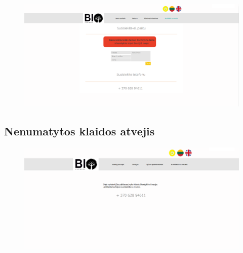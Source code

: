 \documentclass[a4paper,12pt]{article}
\begin{document}
\begin{figure}[!tph]
\hspace{-2cm}
\includegraphics[scale=0.5]{interfeisai/susisiekimasSuKlaida}
\label{fig:verticalcell}
\end{figure}

\subsection{Nenumatytos klaidos atvejis}
\begin{figure}[!tph]
\hspace{-3cm}
\centering
\includegraphics[scale=0.5]{interfeisai/bendraKlaida}
\label{fig:verticalcell}
\end{figure}

\clearpage
\end{document}
